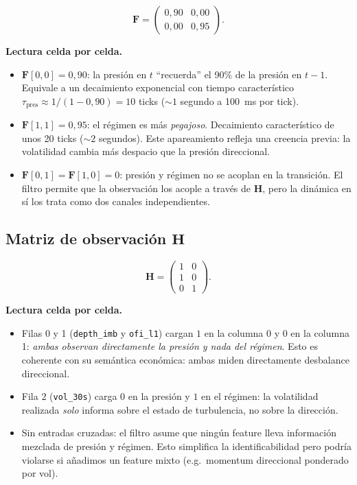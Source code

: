 \documentclass[journal,onecolumn,11pt]{IEEEtran}
\newcommand{\Fm}{\mathbf{F}}
\newcommand{\Hm}{\mathbf{H}}
\begin{document}
\begin{equation}
\Fm = \begin{pmatrix}0{,}90 & 0{,}00 \\ 0{,}00 & 0{,}95\end{pmatrix}.
\label{eq:Fmatrix}
\end{equation}

\noindent
\textbf{Lectura celda por celda.}
\begin{itemize}
\item $\Fm[0,0]=0{,}90$: la presión en $t$ ``recuerda'' el 90\% de la
      presión en $t-1$. Equivale a un decaimiento exponencial con tiempo
      característico
      $\tau_{\text{pres}}\!\approx\!1/(1-0{,}90)\!=\!10$ ticks
      ($\sim\!1$ segundo a 100~ms por tick).
\item $\Fm[1,1]=0{,}95$: el régimen es más \emph{pegajoso}. Decaimiento
      característico de unos 20 ticks ($\sim\!2$ segundos). Este
      apareamiento refleja una creencia previa: la volatilidad cambia
      más despacio que la presión direccional.
\item $\Fm[0,1]=\Fm[1,0]=0$: presión y régimen no se acoplan en la
      transición. El filtro permite que la observación los acople a
      través de $\Hm$, pero la dinámica en sí los trata como dos canales
      independientes.
\end{itemize}

\subsection{Matriz de observación $\Hm$}

\begin{equation}
\Hm =
\begin{pmatrix}
1 & 0 \\
1 & 0 \\
0 & 1
\end{pmatrix}.
\label{eq:Hmatrix}
\end{equation}

\noindent
\textbf{Lectura celda por celda.}
\begin{itemize}
\item Filas 0 y 1 (\texttt{depth\_imb} y \texttt{ofi\_l1}) cargan
      $1$ en la columna 0 y $0$ en la columna 1: \emph{ambas observan
      directamente la presión y nada del régimen}. Esto es coherente
      con su semántica económica: ambas miden directamente desbalance
      direccional.
\item Fila 2 (\texttt{vol\_30s}) carga $0$ en la presión y $1$ en el
      régimen: la volatilidad realizada \emph{solo} informa sobre el
      estado de turbulencia, no sobre la dirección.
\item Sin entradas cruzadas: el filtro asume que ningún feature lleva
      información mezclada de presión y régimen. Esto simplifica la
      identificabilidad pero podría violarse si añadimos un feature
      mixto (e.g.\ momentum direccional ponderado por vol).
\end{itemize}
\end{document}
